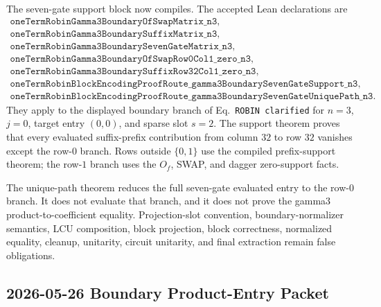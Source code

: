 The seven-gate support block now compiles.  The accepted Lean declarations are
\[
\begin{array}{l}
\texttt{oneTermRobinGamma3BoundaryOfSwapMatrix\_n3},\\
\texttt{oneTermRobinGamma3BoundarySuffixMatrix\_n3},\\
\texttt{oneTermRobinGamma3BoundarySevenGateMatrix\_n3},\\
\texttt{oneTermRobinGamma3BoundaryOfSwapRow0Col1\_zero\_n3},\\
\texttt{oneTermRobinGamma3BoundarySuffixRow32Col1\_zero\_n3},\\
\texttt{oneTermRobinBlockEncodingProofRoute\_gamma3BoundarySevenGateSupport\_n3},\\
\texttt{oneTermRobinBlockEncodingProofRoute\_gamma3BoundarySevenGateUniquePath\_n3}.
\end{array}
\]
They apply to the displayed boundary branch of Eq.~\texttt{ROBIN clarified}
for \(n=3\), \(j=0\), target entry \((0,0)\), and sparse slot \(s=2\).
The support theorem proves that every evaluated suffix-prefix contribution
from column \(32\) to row \(32\) vanishes except the row-\(0\) branch.  Rows
outside \(\{0,1\}\) use the compiled prefix-support theorem; the row-\(1\)
branch uses the \(O_f\), SWAP, and dagger zero-support facts.

The unique-path theorem reduces the full seven-gate evaluated entry to the
row-\(0\) branch.  It does not evaluate that branch, and it does not prove the
gamma3 product-to-coefficient equality.  Projection-slot convention,
boundary-normalizer semantics, LCU composition, block projection, block
correctness, normalized equality, cleanup, unitarity, circuit unitarity, and
final extraction remain false obligations.

\subsection{2026-05-26 Boundary Product-Entry Packet}

